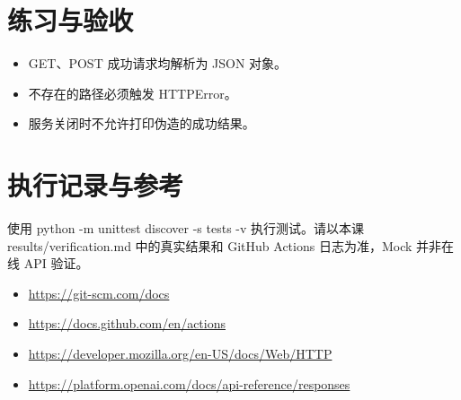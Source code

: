 \documentclass[UTF8,11pt,a4paper]{ctexart}
\begin{document}
\section{练习与验收}
\begin{itemize}
\item GET、POST 成功请求均解析为 JSON 对象。
\item 不存在的路径必须触发 HTTPError。
\item 服务关闭时不允许打印伪造的成功结果。
\end{itemize}
\section{执行记录与参考}
使用 python -m unittest discover -s tests -v 执行测试。请以本课 results/verification.md 中的真实结果和 GitHub Actions 日志为准，Mock 并非在线 API 验证。
\begin{itemize}
\item \url{https://git-scm.com/docs}
\item \url{https://docs.github.com/en/actions}
\item \url{https://developer.mozilla.org/en-US/docs/Web/HTTP}
\item \url{https://platform.openai.com/docs/api-reference/responses}
\end{itemize}
\end{document}
